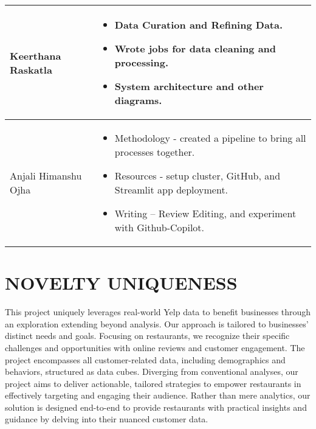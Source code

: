 \documentclass[conference]{IEEEtran}
\begin{document}
\begin{table}[h]
\begin{tabular}{|p{1.0in}|p{2.0in}|}
    \hline
    Keerthana Raskatla & 
        \begin{itemize}
          \item Data Curation and  Refining Data.
          \item Wrote jobs for data cleaning and processing. 
          \item System architecture and other diagrams. 
        \end{itemize}
        \\
    
    \hline
    Anjali Himanshu Ojha & 
        \begin{itemize}
          \item Methodology - created a pipeline to bring all processes together.
          \item Resources - setup cluster, GitHub, and Streamlit app deployment.
          \item Writing – Review  Editing, and experiment with Github-Copilot.
        \end{itemize}
        \\
    \hline
  \end{tabular}
\end{table}





\section{NOVELTY UNIQUENESS}
This project uniquely leverages real-world Yelp data to benefit businesses through an exploration extending beyond analysis. Our approach is tailored to businesses' distinct needs and goals. Focusing on restaurants, we recognize their specific challenges and opportunities with online reviews and customer engagement. The project encompasses all customer-related data, including demographics and behaviors, structured as data cubes. Diverging from conventional analyses, our project aims to deliver actionable, tailored strategies to empower restaurants in effectively targeting and engaging their audience. Rather than mere analytics, our solution is designed end-to-end to provide restaurants with practical insights and guidance by delving into their nuanced customer data.


\end{document}
